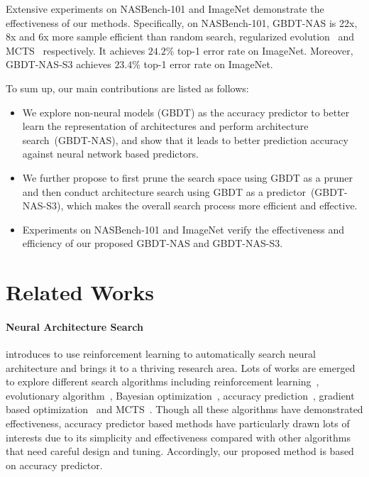 \documentclass{article}
\begin{document}
Extensive experiments on NASBench-101 and ImageNet demonstrate the effectiveness of our methods. Specifically, on NASBench-101, GBDT-NAS is 22x, 8x and 6x more sample efficient than random search, regularized evolution~\cite{amoebanet} and MCTS~\cite{mctsnas} respectively. It achieves $24.2\%$ top-1 error rate on ImageNet. Moreover, GBDT-NAS-S3 achieves $23.4\%$ top-1 error rate on ImageNet.

To sum up, our main contributions are listed as follows:
\begin{itemize}
    \item We explore non-neural models (GBDT) as the accuracy predictor to better learn the representation of architectures and perform architecture search~(GBDT-NAS), and show that it leads to better prediction accuracy against neural network based predictors.
    \item We further propose to first prune the search space using GBDT as a pruner and then conduct architecture search using GBDT as a predictor~(GBDT-NAS-S3), which makes the overall search process more efficient and effective.
    \item Experiments on NASBench-101 and ImageNet verify the effectiveness and efficiency of our proposed GBDT-NAS and GBDT-NAS-S3. 
\end{itemize}

\section{Related Works}
\label{sec:rework}
\paragraph{Neural Architecture Search}
\cite{nas} introduces to use reinforcement learning to automatically search neural architecture and brings it to a thriving research area. Lots of works are emerged to explore different search algorithms including reinforcement learning~\cite{nasnet,enas}, evolutionary algorithm~\cite{genetic_cnn,evolvingNN,EA_2017,amoebanet}, Bayesian optimization~\cite{bayesnas}, accuracy prediction~\cite{perfpred,PNAS,nao,neuralpredictor}, gradient based optimization~\cite{nao,darts} and MCTS~\cite{deeparchitect,mctsnas,lanas}. Though all these algorithms have demonstrated effectiveness, accuracy predictor based methods have particularly drawn lots of interests due to its simplicity and effectiveness compared with other algorithms that need careful design and tuning. Accordingly, our proposed method is based on accuracy predictor.
\end{document}
